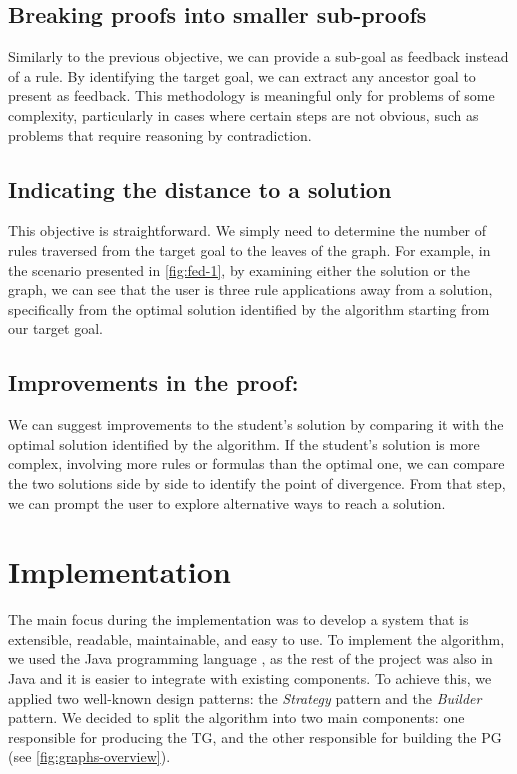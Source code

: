 \subsection*{Breaking proofs into smaller sub-proofs} Similarly to the previous objective, we can provide a sub-goal as feedback instead of a rule. By identifying the target goal, we can extract any ancestor goal to present as feedback. This methodology is meaningful only for problems of some complexity, particularly in cases where certain steps are not obvious, such as problems that require reasoning by contradiction.

\subsection*{Indicating the distance to a solution} This objective is straightforward. We simply need to determine the number of rules traversed from the target goal to the leaves of the graph. For example, in the scenario presented in \autoref{fig:fed-1}, by examining either the solution or the graph, we can see that the user is three rule applications away from a solution, specifically from the optimal solution identified by the algorithm starting from our target goal.

\subsection*{Improvements in the proof:} We can suggest improvements to the student's solution by comparing it with the optimal solution identified by the algorithm. If the student's solution is more complex, involving more rules or formulas than the optimal one, we can compare the two solutions side by side to identify the point of divergence. From that step, we can prompt the user to explore alternative ways to reach a solution.

\section{Implementation}
The main focus during the implementation was to develop a system that is extensible, readable, maintainable, and easy to use. To implement the algorithm, we used the Java programming language \cite{java}, as the rest of the project was also in Java and it is easier to integrate with existing components. To achieve this, we applied two well-known design patterns: the \emph{Strategy} pattern and the \emph{Builder} pattern. We decided to split the algorithm into two main components: one responsible for producing the \gls{TG}, and the other responsible for building the \gls{PG} (see \autoref{fig:graphs-overview}).

